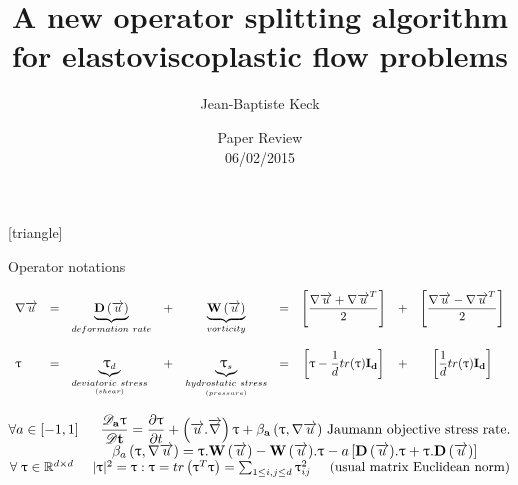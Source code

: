 




[triangle]




\title{\Large A new operator splitting algorithm for elastoviscoplastic flow problems}
\author[Keck]{\Large Jean-Baptiste Keck}
\date{\large Paper Review\\ 06/02/2015}



\begin{frame}
    \titlepage
\end{frame}



\begin{frame}{Operator notations} 

    \tiny

$
\begin{array}{l l l c c l c l c}
    \gradv& = & 
    \underbrace{\D}_{deformation\ rate}& + & \underbrace{\W}_{vorticity}& = &
    \left[\dfrac{\gradv + \gradv^T}{2}\right]& + & \left[\dfrac{\gradv - \gradv^T}{2}\right] \\
    \\
    \Tau & = & \underbrace{\Tau_d}_{\underset{(shear)}{deviatoric\ stress}}& + & \underbrace{\Tau_s}_{\underset{(pressure)}{hydrostatic\ stress}} &
    = & \left[\Tau - \dfrac{1}{d}tr(\Tau)\tensor{I_d}\right]& + & \left[\dfrac{1}{d}tr(\Tau)\tensor{I_d}\right]
\end{array}
$
    
\vskip 0.5cm
$
\forall a \in \left[ -1,1\right] \hspace{0.5cm}
\tensor{\od{\Tau}{t}} = \pd{\Tau}{t} + \left(\v . \grad \right) \Tau + \tensor{\beta_a \left( \Tau, \gradv \right)}
\textrm{ Jaumann objective stress rate.}
$
\vskip 0.5cm
$
\hskip 2.6cm
\beta_a \left( \Tau, \gradv \right) = \Tau . \W - \W . \Tau - a \left[ \D.\Tau + \Tau . \D \right]
$
\vskip 0.5cm
$
\forall \; \Tau \in \mathbb{R}^{d \times d} \hskip 0.5cm
|\Tau|^2=
\Tau : \Tau =
tr\left(\Tau^T \Tau \right) =
\sum_{1\leq i,j \leq d}\Tau_{ij}^2 \hskip 0.5cm \textrm{(usual matrix Euclidean norm)}
$

\end{frame}


